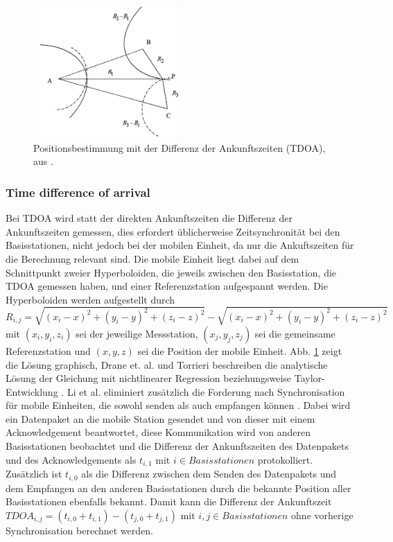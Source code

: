 \begin{figure}[h]
  \centering
	\includegraphics[width=0.5\textwidth]{images/tdoa.png}
  \caption{Positionsbestimmung mit der Differenz der Ankunftszeiten (TDOA), aus \cite{liu2007survey}.}
  \label{fig:tdoa}
\end{figure}


\subsubsection{Time difference of arrival}
Bei TDOA wird statt der direkten Ankunftszeiten die Differenz der Ankunftszeiten gemessen, dies erfordert üblicherweise Zeitsynchronität bei den Basisstationen, nicht jedoch bei der mobilen Einheit, da nur die Ankuftszeiten für die Berechnung relevant sind. Die mobile Einheit liegt dabei auf dem Schnittpunkt zweier Hyperboloiden, die jeweils zwischen den Basisstation, die TDOA gemessen haben, und einer Referenzstation aufgespannt werden. 
Die Hyperboloiden werden aufgestellt durch \\
$R_{i,j} = \sqrt{(x_i - x)^2 + (y_i - y)^2 + (z_i - z)^2} - \sqrt{(x_i - x)^2 + (y_i - y)^2 + (z_i - z)^2}$ mit $(x_i,y_i,z_i)$ sei der jeweilige Messstation, $(x_j,y_j,z_j)$ sei die gemeinsame Referenzstation und $(x,y,z)$ sei die Position der mobile Einheit. %
Abb. \ref{fig:tdoa} zeigt die Lösung graphisch, Drane et. al. und Torrieri beschreiben die analytische Lösung der Gleichung mit nichtlinearer Regression \cite{drane1998positioning} beziehungsweise Taylor-Entwicklung \cite{torrieri1984statistical}. 
Li et al. eliminiert zusätzlich die Forderung nach Synchronisation für mobile Einheiten, die sowohl senden als auch empfangen können \cite{li2000comparison}. 
Dabei wird ein Datenpaket an die mobile Station gesendet und von dieser mit einem Acknowledgement beantwortet, diese Kommunikation wird von anderen Basisstationen beobachtet und die Differenz der Ankunftszeiten des Datenpakets und des Acknowledgements als $t_{i,1}$ mit $i \in Basisstationen$ protokolliert. Zusätzlich ist $t_{i,0}$ als die Differenz zwischen dem Senden des Datenpakets und dem Empfangen an den anderen Basisstationen durch die bekannte Position aller Basisstationen ebenfalls bekannt. Damit kann die Differenz der Ankunftszeit $TDOA_{i,j} = (t_{i,0} + t_{i,1}) - (t_{j,0} + t_{j,1})$ mit $i,j \in Basisstationen$ ohne vorherige Synchronisation berechnet werden. \\


